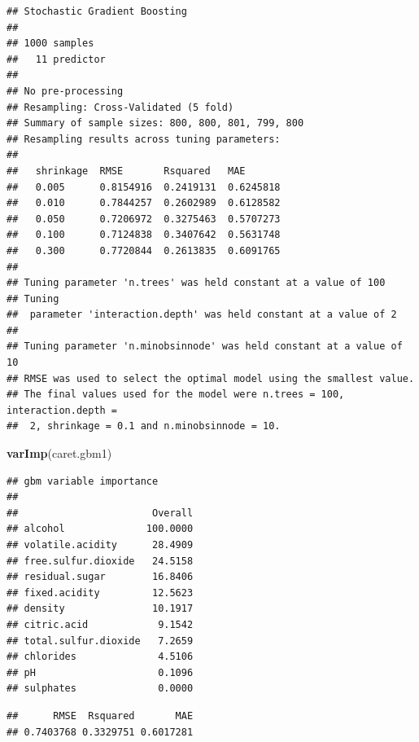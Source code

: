 \documentclass[
]{book}
\newenvironment{Shaded}{\begin{snugshade}}{\end{snugshade}}
\newcommand{\DataTypeTok}[1]{\textcolor[rgb]{0.13,0.29,0.53}{#1}}
\newcommand{\KeywordTok}[1]{\textcolor[rgb]{0.13,0.29,0.53}{\textbf{#1}}}
\newcommand{\NormalTok}[1]{#1}
\newcommand{\OperatorTok}[1]{\textcolor[rgb]{0.81,0.36,0.00}{\textbf{#1}}}
\theoremstyle{break}
\theoremstyle{definition}
\theoremstyle{definition}
\theoremstyle{definition}
\theoremstyle{remark}
\begin{document}
\begin{verbatim}
## Stochastic Gradient Boosting 
## 
## 1000 samples
##   11 predictor
## 
## No pre-processing
## Resampling: Cross-Validated (5 fold) 
## Summary of sample sizes: 800, 800, 801, 799, 800 
## Resampling results across tuning parameters:
## 
##   shrinkage  RMSE       Rsquared   MAE      
##   0.005      0.8154916  0.2419131  0.6245818
##   0.010      0.7844257  0.2602989  0.6128582
##   0.050      0.7206972  0.3275463  0.5707273
##   0.100      0.7124838  0.3407642  0.5631748
##   0.300      0.7720844  0.2613835  0.6091765
## 
## Tuning parameter 'n.trees' was held constant at a value of 100
## Tuning
##  parameter 'interaction.depth' was held constant at a value of 2
## 
## Tuning parameter 'n.minobsinnode' was held constant at a value of 10
## RMSE was used to select the optimal model using the smallest value.
## The final values used for the model were n.trees = 100, interaction.depth =
##  2, shrinkage = 0.1 and n.minobsinnode = 10.
\end{verbatim}

\begin{Shaded}
\begin{Highlighting}[]
\KeywordTok{varImp}\NormalTok{(caret.gbm1)}
\end{Highlighting}
\end{Shaded}

\begin{verbatim}
## gbm variable importance
## 
##                       Overall
## alcohol              100.0000
## volatile.acidity      28.4909
## free.sulfur.dioxide   24.5158
## residual.sugar        16.8406
## fixed.acidity         12.5623
## density               10.1917
## citric.acid            9.1542
## total.sulfur.dioxide   7.2659
## chlorides              4.5106
## pH                     0.1096
## sulphates              0.0000
\end{verbatim}

\begin{Shaded}
\end{Shaded}

\begin{verbatim}
##      RMSE  Rsquared       MAE 
## 0.7403768 0.3329751 0.6017281
\end{verbatim}
\end{document}
